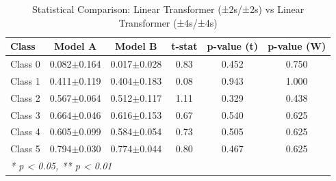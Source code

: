 \begin{table}[htbp]
\centering
\caption{Statistical Comparison: Linear Transformer (±2s/±2s) vs Linear Transformer (±4s/±4s)}
\label{tab:comparison_class_linear_transformer_±2s_±2s_vs_linear_transformer_±4s_±4s}
\begin{tabular}{lccccc}
\toprule
\textbf{Class} & \textbf{Model A} & \textbf{Model B} & \textbf{t-stat} & \textbf{p-value (t)} & \textbf{p-value (W)} \\
\midrule
Class 0 & 0.082$\pm$0.164 & 0.017$\pm$0.028 & 0.83 & 0.452 & 0.750 \\
Class 1 & 0.411$\pm$0.119 & 0.404$\pm$0.183 & 0.08 & 0.943 & 1.000 \\
Class 2 & 0.567$\pm$0.064 & 0.512$\pm$0.117 & 1.11 & 0.329 & 0.438 \\
Class 3 & 0.664$\pm$0.046 & 0.616$\pm$0.153 & 0.67 & 0.540 & 0.625 \\
Class 4 & 0.605$\pm$0.099 & 0.584$\pm$0.054 & 0.73 & 0.505 & 0.625 \\
Class 5 & 0.794$\pm$0.030 & 0.774$\pm$0.044 & 0.80 & 0.467 & 0.625 \\
\bottomrule
\multicolumn{6}{l}{\textit{* p < 0.05, ** p < 0.01}} \\
\end{tabular}
\end{table}